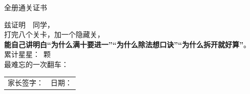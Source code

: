 \vspace{6pt}
\begin{center}
\begin{tcolorbox}[enhanced,colback=white,colframe=mainc,boxrule=2pt,arc=3mm,
                  width=15.6cm,left=12pt,right=12pt,top=12pt,bottom=12pt]
\begin{center}
{\heiti\Large\color{mainc} 全册通关证书}\\[8pt]
{\kaishu\large
兹证明\ {\Large\underline{\hspace{5cm}}}\ 同学，\\[6pt]
打完八个关卡，加一个隐藏关，\\[4pt]
\textbf{能自己讲明白“为什么满十要进一”“为什么除法想口诀”“为什么拆开就好算”}。\\[10pt]
累计星星：\underline{\hspace{2.4cm}}\ 颗\\[8pt]
最难忘的一次翻车：\underline{\hspace{8cm}}\\[10pt]
\begin{tabular}{@{}p{6cm}p{6cm}@{}}
家长签字：\underline{\hspace{3.2cm}} & 日期：\underline{\hspace{3.2cm}}\\
\end{tabular}}
\end{center}
\end{tcolorbox}
\end{center}
